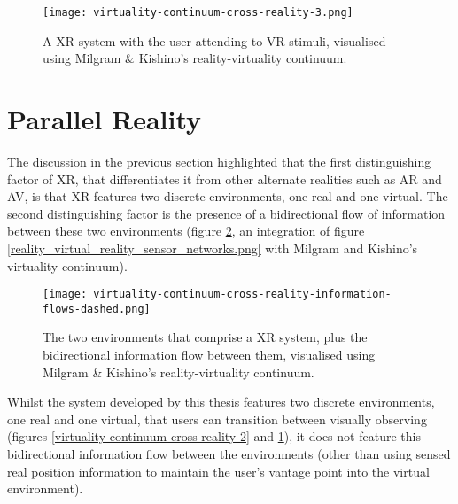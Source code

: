 \begin{figure}[h]
	\begin{center}
		\texttt{[image: virtuality-continuum-cross-reality-3.png]}
		\caption{A XR system with the user attending to VR stimuli, visualised using Milgram \& Kishino's reality-virtuality continuum.}
		\label{virtuality-continuum-cross-reality-3}
	\end{center}
\end{figure}


\section{Parallel Reality}

\newcommand{\PRfootnote}{\footnote{Note that the use of `PR' in the quotation in section \ref{subsec_HyperReality} is a reference to `physical reality' (that author's term for what this thesis simply calls `reality') and is not a reference to parallel reality.}}

The discussion in the previous section highlighted that the first distinguishing factor of XR, that differentiates it from other alternate realities such as AR and AV, is that XR features two discrete environments, one real and one virtual. The second distinguishing factor is the presence of a bidirectional flow of information between these two environments (figure \ref{virtuality-continuum-cross-reality-information-flows-dashed.png}, an integration of figure \ref{reality_virtual_reality_sensor_networks.png} with Milgram and Kishino's virtuality continuum).

\begin{figure}[h]
	\begin{center}
		\texttt{[image: virtuality-continuum-cross-reality-information-flows-dashed.png]}
		\caption{The two environments that comprise a XR system, plus the bidirectional information flow between them, visualised using Milgram \& Kishino's reality-virtuality continuum.}
		\label{virtuality-continuum-cross-reality-information-flows-dashed.png}
	\end{center}
\end{figure}

Whilst the system developed by this thesis features two discrete environments, one real and one virtual, that users can transition between visually observing (figures \ref{virtuality-continuum-cross-reality-2} and \ref{virtuality-continuum-cross-reality-3}), it does not feature this bidirectional information flow between the environments (other than using sensed real position information to maintain the user's vantage point into the virtual environment).

